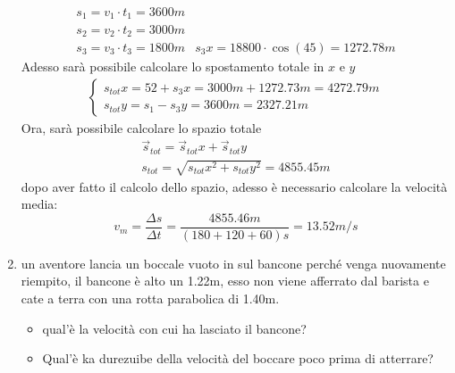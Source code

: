\documentclass{article}
\begin{document}
\begin{enumerate}
  \begin{eqnarray*}
    s_1=v_1\cdot t_1=3600m\\
    s_2=v_2\cdot t_2=3000m\\
    s_3=v_3\cdot t_3=1800m & s_3x = 18800\cdot \cos(45)=1272.78m
  \end{eqnarray*}
  Adesso sarà possibile calcolare lo spostamento totale in $x$ e $y$
  \begin{eqnarray*}
    \begin{cases}
      s_{tot}x= 52+s_3x=3000m+1272.73m=4272.79m \\
      s_{tot}y= s_1-s_3y= 3600m=2327.21m
    \end{cases}
  \end{eqnarray*}
  Ora, sarà possibile calcolare lo spazio totale
  \begin{eqnarray*}
    \vec{s}_{tot}=\vec{s}_{tot}x+\vec{s}_{tot}y\\
    s_{tot}=\sqrt{s_{tot}x^2+s_{tot}y^2}=4855.45m
  \end{eqnarray*}
  dopo aver fatto il calcolo dello spazio, adesso è necessario calcolare la velocità media:
  \begin{equation*}
    v_m=\frac{\Delta s}{\Delta t}=\frac{4855.46m}{(180+120+60)s}=13.52m/s
  \end{equation*}
\item un aventore lancia un boccale vuoto in sul bancone perché venga nuovamente riempito, il bancone è alto un 1.22m, esso non viene afferrato dal barista e cate a terra con una rotta parabolica di 1.40m.
  \begin{itemize}
  \item qual'è la velocità con cui ha lasciato il bancone?
  \item Qual'è ka durezuibe della velocità del boccare poco prima di atterrare?
  \end{itemize}
  
\end{enumerate}
\end{document}
